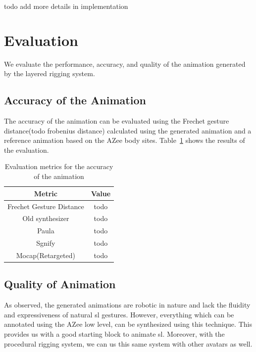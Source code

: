 \documentclass[../../main.tex]{subfiles}
\begin{document}
{todo add more details in implementation

\section{Evaluation}
\label{ch:avatar_creation_pose_synthesis:evaluation}

We evaluate the performance, accuracy, and quality of the animation generated by the layered rigging system.

\subsection{Accuracy of the Animation}
\label{ch:avatar_creation_pose_synthesis:evaluation:accuracy}

The accuracy of the animation can be evaluated using the Frechet gesture distance(todo frobenius distance) calculated using the generated animation and a reference animation based on the AZee body sites. Table~\ref{tab:accuracy_metrics} shows the results of the evaluation.

\begin{table}
    \centering
    \begin{tabular}{|c|c|}
        \hline
        \textbf{Metric} & \textbf{Value} \\
        \hline
        Frechet Gesture Distance & todo \\
        Old synthesizer & todo \\
        Paula & todo \\
        Sgnify & todo \\
        Mocap(Retargeted) & todo \\
        \hline
    \end{tabular}
    \caption{Evaluation metrics for the accuracy of the animation}
    \label{tab:accuracy_metrics}
\end{table}

\subsection{Quality of Animation}
\label{ch:avatar_creation_pose_synthesis:evaluation:quality}

As observed, the generated animations are robotic in nature and lack the fluidity and expressiveness of natural \gls{sl} gestures. However, everything which can be annotated using the AZee low level, can be synthesized using this technique. This provides us with a good starting block to animate \gls{sl}. Moreover, with the procedural rigging system, we can us this same system with other avatars as well.

}
\end{document}
